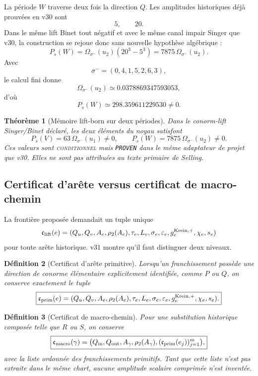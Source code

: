\documentclass[11pt,a4paper]{article}
\newtheorem{theorem}{Théorème}[section]
\newtheorem{definition}[theorem]{Définition}
\newcommand{\statusCond}{\textsc{conditionnel}}
\newcommand{\certProven}{\texttt{PROVEN}}
\begin{document}
La période $W$ traverse deux fois la direction $Q$. Les amplitudes historiques déjà prouvées en
v30 sont
\[
 5,\qquad20.
\]
Dans le même lift Binet tout négatif et avec le même canal impair Singer que v30, la construction
se rejoue donc sans nouvelle hypothèse algébrique :
\begin{equation}\label{eq:v31-memory-W}
 \boxed{
 P_s(W)
 =\Omega_{\sigma^-}(u_2)(20^3-5^3)
 =7875\,\Omega_{\sigma^-}(u_2).}
\end{equation}
Avec
\[
 \sigma^-=(0,4,1,5,2,6,3),
\]
le calcul fini donne
\[
 \Omega_{\sigma^-}(u_2)
 \simeq0.0378869347593053,
\]
d'où
\begin{equation}\label{eq:v31-memory-W-num}
 \boxed{
 P_s(W)\simeq298.359611229530\neq0.}
\end{equation}

\begin{theorem}[Mémoire lift-born sur deux périodes]\label{thm:v31-two-memory-periods}
Dans le conorm-lift Singer/Binet déclaré, les deux éléments du noyau satisfont
\[
 \boxed{
 P_s(V)=63\,\Omega_{\sigma^-}(u_1)\neq0,
 \qquad
 P_s(W)=7875\,\Omega_{\sigma^-}(u_2)\neq0.}
\]
Ces valeurs sont \statusCond{} mais \certProven{} dans le même adaptateur de projet que v30.
Elles ne sont pas attribuées au texte primaire de Selling.
\end{theorem}

\subsection{Certificat d'arête versus certificat de macro-chemin}

La frontière proposée demandait un tuple unique
\[
 \mathfrak c_{\rm lift}(e)
 =
 (Q_u,Q_v,A_e,\rho_2(A_e),\tau_e,L_e,\sigma_e,
 \varepsilon_e,g_e^{\rm Krein,+},\chi_e,s_e)
\]
pour toute arête historique. v31 montre qu'il faut distinguer deux niveaux.

\begin{definition}[Certificat d'arête primitive]\label{def:v31-primitive-cert}
Lorsqu'un franchissement possède une direction de conorme élémentaire explicitement identifiée,
comme $P$ ou $Q$, on conserve exactement le tuple
\begin{equation}\label{eq:v31-primitive-tuple}
 \boxed{
 \mathfrak c_{\rm prim}(e)
 =(Q_u,Q_v,A_e,\rho_2(A_e),\tau_e,L_e,\sigma_e,
 \varepsilon_e,g_e^{\rm Krein,+},\chi_e,s_e).}
\end{equation}
\end{definition}

\begin{definition}[Certificat de macro-chemin]\label{def:v31-macro-cert}
Pour une substitution historique composée telle que $R$ ou $S$, on conserve
\begin{equation}\label{eq:v31-macro-tuple}
 \boxed{
 \mathfrak c_{\rm macro}(\gamma)
 =\bigl(Q_{\rm in},Q_{\rm out},A_\gamma,\rho_2(A_\gamma),
 (\mathfrak c_{\rm prim}(e_j))_{j=1}^{m}\bigr),}
\end{equation}
avec la liste ordonnée des franchissements primitifs. Tant que cette liste n'est pas extraite dans
le même chart, aucune amplitude scalaire comprimée n'est inventée.
\end{definition}
\end{document}
